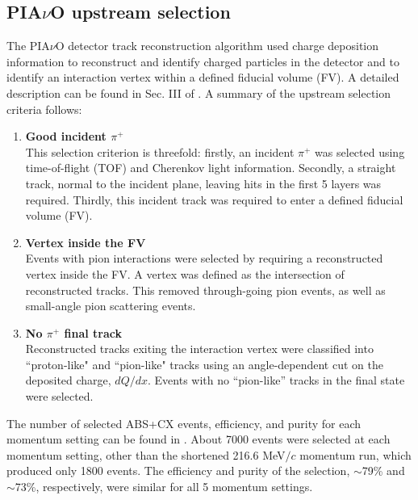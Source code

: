\subsection{PIA$\nu$O upstream selection}
The PIA$\nu$O detector track reconstruction algorithm used charge deposition information to reconstruct and identify charged particles in the detector and to identify an interaction vertex within a defined fiducial volume (FV). A detailed description can be found in Sec. III of \cite{duet}. A summary of the upstream selection criteria follows:
\begin{enumerate}
\item {\bf Good incident $\pi^{+}$\\}
This selection criterion is threefold: firstly, an incident $\pi^{+}$ was selected using time-of-flight (TOF) and Cherenkov light information. Secondly, a straight track, normal to the incident plane, leaving hits in the first 5 layers was required. Thirdly, this incident track was required to enter a defined fiducial volume (FV).
\item {\bf Vertex inside the FV\\}
Events with pion interactions were selected by requiring a reconstructed vertex inside the FV.  A vertex was defined as the intersection of reconstructed tracks. This removed through-going pion events, as well as small-angle pion scattering events.
\item {\bf No $\pi^{+}$ final track\\}
Reconstructed tracks exiting the interaction vertex were classified into ``proton-like" and ``pion-like" tracks using an angle-dependent cut on the deposited charge, $dQ/dx$. Events with no ``pion-like'' tracks in the final state were selected.
\end{enumerate}
The number of selected ABS+CX events, efficiency, and purity for each momentum setting can be found in \cite{duet}. About 7000 events were selected at each momentum setting, other than the shortened 216.6 MeV$/c$ momentum run, which produced only 1800 events. The efficiency and purity of the selection, $\sim$79\% and $\sim$73\%, respectively, were similar for all 5 momentum settings.

